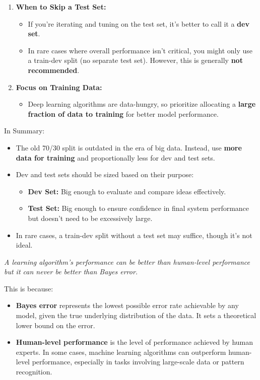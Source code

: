 \documentclass[letterpaper,12pt,notitlepage,twoside]{report}
\begin{document}
\begin{enumerate}[label=\textbf{\arabic*.}]
    \item \textbf{When to Skip a Test Set:}
    \begin{itemize}
        \item If you’re iterating and tuning on the test set, it’s better to call it a \textbf{dev set}.
        \item In rare cases where overall performance isn't critical, you might only use a train-dev split (no separate test set). However, this is generally \textbf{not recommended}.
    \end{itemize}

    \item \textbf{Focus on Training Data:}
    \begin{itemize}
        \item Deep learning algorithms are data-hungry, so prioritize allocating a \textbf{large fraction of data to training} for better model performance.
    \end{itemize}
\end{enumerate}

In Summary:
\begin{itemize}[noitemsep, topsep=0pt]
    \item The old 70/30 split is outdated in the era of big data. Instead, use \textbf{more data for training} and proportionally less for dev and test sets.
    \item Dev and test sets should be sized based on their purpose:
    \begin{itemize}
        \item \textbf{Dev Set:} Big enough to evaluate and compare ideas effectively.
        \item \textbf{Test Set:} Big enough to ensure confidence in final system performance but doesn’t need to be excessively large.
    \end{itemize}
    \item In rare cases, a train-dev split without a test set may suffice, though it’s not ideal.
\end{itemize}

\begin{thickleftborder}
  \textit{A learning algorithm’s performance can be better than human-level performance but it can never be better than Bayes error.}
\end{thickleftborder}

This is because:
\begin{itemize}[noitemsep, topsep=0pt]
\item \textbf{Bayes error} represents the lowest possible error rate achievable by any model, given the true underlying distribution of the data. It sets a theoretical lower bound on the error.
\item \textbf{Human-level performance} is the level of performance achieved by human experts. In some cases, machine learning algorithms can outperform human-level performance, especially in tasks involving large-scale data or pattern recognition.
\end{itemize}
\end{document}
